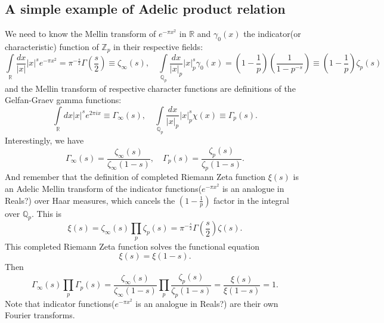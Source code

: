 \documentclass[12pt]{article}
\begin{document}
\subsection{A simple example of Adelic product relation}
We need to know the Mellin transform of $e^{-\pi x^2}$ in $\mathbb{R}$ and $\gamma_0(x)$ the indicator(or characteristic) function of $\mathbb{Z}_p$ in their respective fields:
\begin{equation}
\int\limits_\mathbb{R}\frac{dx}{|x|}|x|^s e^{-\pi x^2}=\pi^{-\frac{s}{2}}\Gamma(\frac{s}{2})\equiv\zeta_\infty(s), \quad \int\limits_{\mathbb{Q}_p}\frac{dx}{|x|_p}|x|_p^s \gamma_0(x)=(1-\frac{1}{p})(\frac{1}{1-p^{-s}})\equiv(1-\frac{1}{p})\zeta_p(s)
\end{equation}
and the Mellin transform of respective character functions are definitions of the Gelfan-Graev gamma functions:
\begin{equation}
\int\limits_\mathbb{R}dx|x|^s e^{2\pi i x}\equiv\Gamma_\infty(s), \quad \int\limits_{\mathbb{Q}_p}\frac{dx}{|x|_p}|x|_p^s \chi(x)\equiv\Gamma_p(s).
\end{equation}
Interestingly, we have
\begin{equation}
\Gamma_\infty(s)=\frac{\zeta_\infty(s)}{\zeta_\infty(1-s)}, \quad \Gamma_p(s)=\frac{\zeta_p(s)}{\zeta_p(1-s)}.
\end{equation}
And remember that the definition of completed Riemann Zeta function $\xi(s)$ is an Adelic Mellin transform of the indicator functions($e^{-\pi x^2}$ is an analogue in Reals?) over Haar measures, which cancels the $(1-\frac{1}{p})$ factor in the integral over $\mathbb{Q}_p$. This is
\begin{equation}
\xi(s)=\zeta_\infty(s)\prod\limits_p\zeta_p(s)=\pi^{-\frac{s}{2}}\Gamma(\frac{s}{2})\zeta(s).
\end{equation}
This completed Riemann Zeta function solves the functional equation
\begin{equation}
\xi(s)=\xi(1-s).
\end{equation}
Then
\begin{equation}
\Gamma_\infty(s)\prod\limits_p\Gamma_p(s)=\frac{\zeta_\infty(s)}{\zeta_\infty(1-s)}\prod\limits_p\frac{\zeta_p(s)}{\zeta_p(1-s)}=\frac{\xi(s)}{\xi(1-s)}=1.
\end{equation}
Note that indicator functions($e^{-\pi x^2}$ is an analogue in Reals?) are their own Fourier transforms.
\end{document}

